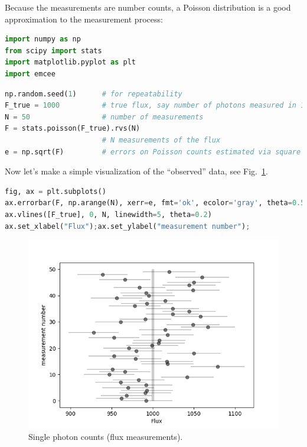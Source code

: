\documentclass[%
oneside,                 %
final,                   %
10pt]{article}
\begin{document}
Because the measurements are number counts, a Poisson distribution is a good approximation to the measurement process:

\begin{lstlisting}[language=Python,style=blue1]
import numpy as np
from scipy import stats
import matplotlib.pyplot as plt
import emcee
\end{lstlisting}

\begin{lstlisting}[language=Python,style=blue1]
np.random.seed(1)      # for repeatability
F_true = 1000          # true flux, say number of photons measured in 1 second
N = 50                 # number of measurements
F = stats.poisson(F_true).rvs(N)
                       # N measurements of the flux
e = np.sqrt(F)         # errors on Poisson counts estimated via square root
\end{lstlisting}

Now let's make a simple visualization of the ``observed'' data, see Fig.~\ref{fig:flux}.

\begin{lstlisting}[language=Python,style=blue1]
fig, ax = plt.subplots()
ax.errorbar(F, np.arange(N), xerr=e, fmt='ok', ecolor='gray', theta=0.5)
ax.vlines([F_true], 0, N, linewidth=5, theta=0.2)
ax.set_xlabel("Flux");ax.set_ylabel("measurement number");
\end{lstlisting}


\begin{figure}[!ht]  %
  \centerline{\includegraphics[width=0.8\linewidth]{fig/singlephotoncount_fig_1.png}}
  \caption{
  Single photon counts (flux measurements). \label{fig:flux}
  }
\end{figure}
\end{document}
